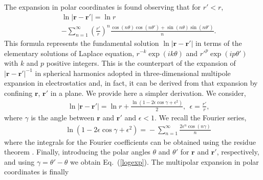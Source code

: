 The expansion in polar coordinates is found observing that for $r'<r$,
\begin{eqnarray}&&
\ln |\bm r-\bm r'|=\ln r\nonumber\\&&
-\sum_{n=1}^{\infty}\left(\frac{r'}{r}\right)^n\frac{\cos(n\theta)\cos(n\theta')+\sin(n\theta)\sin(n\theta')}{n}. \label{logexp}
\end{eqnarray}
This formula represents the fundamental solution $\ln |\bm r-\bm r'|$ in terms of the elementary solutions of Laplace equation, $r^{-k}\exp(ik\theta)$ and $r'^p\exp(ip\theta')$ with  $k$ and $p$ positive integers.
This is the counterpart of the expansion of $|\bm r-\bm r'|^{-1}$ in spherical harmonics adopted in three-dimensional multipole expansion in electrostatics \cite{cl} and, in fact, it can be derived from
that expansion by confining $\bm r$, $\bm r'$ in a plane. We provide here a simpler derivation. We consider,
\begin{eqnarray}&&\!\!\!\!\!\!
\ln |\bm r-\bm r'|=\ln r+\frac{\ln\left(1-2\epsilon\cos\gamma+\epsilon^2\right)}{2},\ \ \epsilon=\frac{r'}{r},
\end{eqnarray}
where $\gamma$ is the angle between $\bm r$ and $\bm r'$ and $\epsilon<1$. We recall the Fourier series,
\begin{eqnarray}&&
\ln\left(1\!-\!2\epsilon\cos\gamma\!+\!\epsilon^2\right)\!=\! -\sum_{n=1}^{\infty}\frac{2\epsilon^n \cos(n\gamma)}{n}\,%
\end{eqnarray}
where the integrals for the Fourier coefficients can be obtained using the residue theorem \cite{grad}.
Finally, introducing the polar angles $\theta$ and $\theta'$ for $\bm r$ and $\bm r'$, respectively, and using $\gamma=\theta'-\theta$ we obtain Eq.~(\ref{logexp}).
The multipolar expansion in polar coordinates is finally

